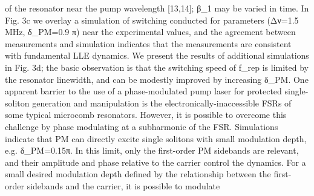 of the resonator near the pump wavelength [13,14];  β_1 may be varied in time.  In Fig. 3c we overlay a simulation of switching conducted for parameters (Δν=1.5 MHz, δ_PM=0.9 π) near the experimental values, and the agreement between measurements and simulation indicates that the measurements are consistent with fundamental LLE dynamics. We present the results of additional simulations in Fig. 3d; the basic observation is that the switching speed of f_rep is limited by the resonator linewidth, and can be modestly improved by increasing δ_PM.
One apparent barrier to the use of a phase-modulated pump laser for protected single-soliton generation and manipulation is the electronically-inaccessible FSRs of some typical microcomb resonators. However, it is possible to overcome this challenge by phase modulating at a subharmonic of the FSR.  Simulations indicate that PM can directly excite single solitons with small modulation depth, e.g. δ_PM=0.15π. In this limit, only the first-order PM sidebands are relevant, and their amplitude and phase relative to the carrier control the dynamics. For a small desired modulation depth defined by the relationship between the first-order sidebands and the carrier, it is possible to modulate


